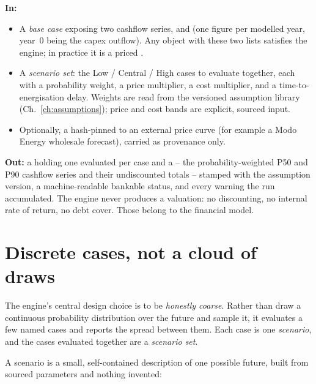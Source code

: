 \begin{contract}
\textbf{In:}
\begin{itemize}
  \item A \emph{base case} exposing two cashflow series,  and  (one figure per modelled year, year~0 being the capex outflow). Any object with these two lists satisfies the engine; in practice it is a priced .
  \item A \emph{scenario set}: the Low / Central / High cases to evaluate together, each with a probability weight, a price multiplier, a cost multiplier, and a time-to-energisation delay. Weights are read from the versioned assumption library (Ch.~\ref{ch:assumptions}); price and cost bands are explicit, sourced input.
  \item Optionally, a hash-pinned  to an external price curve (for example a Modo Energy wholesale forecast), carried as provenance only.
\end{itemize}
\textbf{Out:} a  holding one evaluated  per case and a  -- the probability-weighted P50 and P90 cashflow series and their undiscounted totals -- stamped with the assumption version, a machine-readable bankable status, and every warning the run accumulated. The engine never produces a valuation: no discounting, no internal rate of return, no debt cover. Those belong to the financial model.
\end{contract}

\section{Discrete cases, not a cloud of draws}

The engine's central design choice is to be \emph{honestly coarse}. Rather than draw a continuous probability distribution over the future and sample it, it evaluates a few named cases and reports the spread between them. Each case is one \emph{scenario}, and the cases evaluated together are a \emph{scenario set}.

A scenario is a small, self-contained description of one possible future, built from sourced parameters and nothing invented:


